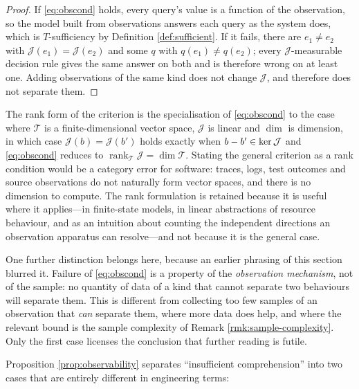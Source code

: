 \begin{proof}
If \eqref{eq:obscond} holds, every query's value is a function of the observation, so the model
built from observations answers each query as the system does, which is $T$-sufficiency by
Definition \ref{def:sufficient}. If it fails, there are $e_1 \ne e_2$ with $\mathcal{J}(e_1) =
\mathcal{J}(e_2)$ and some $q$ with $q(e_1) \ne q(e_2)$; every $\mathcal{J}$-measurable decision
rule gives the same answer on both and is therefore wrong on at least one. Adding observations of
the same kind does not change $\mathcal{J}$, and therefore does not separate them.
\end{proof}

The rank form of the criterion is the specialisation of \eqref{eq:obscond} to the case where
$\mathcal{T}$ is a finite-dimensional vector space, $\mathcal{J}$ is linear and $\dim$ is dimension,
in which case $\mathcal{J}(b) = \mathcal{J}(b')$ holds exactly when $b - b' \in \operatorname{ker} \mathcal{J}$ and
\eqref{eq:obscond} reduces to $\operatorname{rank}_{\mathcal{T}}\mathcal{J} = \dim \mathcal{T}$.
Stating the general criterion as a rank condition would be a category error for software: traces,
logs, test outcomes and source observations do not naturally form vector spaces, and there is no
dimension to compute. The rank formulation is retained because it is useful where it applies---in
finite-state models, in linear abstractions of resource behaviour, and as an intuition about
counting the independent directions an observation apparatus can resolve---and not because it is the
general case.

One further distinction belongs here, because an earlier phrasing of this section blurred it.
Failure of \eqref{eq:obscond} is a property of the \emph{observation mechanism}, not of the sample:
no quantity of data of a kind that cannot separate two behaviours will separate them. This is
different from collecting too few samples of an observation that \emph{can} separate them, where
more data does help, and where the relevant bound is the sample complexity of
Remark \ref{rmk:sample-complexity}. Only the first case licenses the conclusion that further reading
is futile.

Proposition \ref{prop:observability} separates ``insufficient comprehension'' into two cases
that are entirely different in engineering terms:

